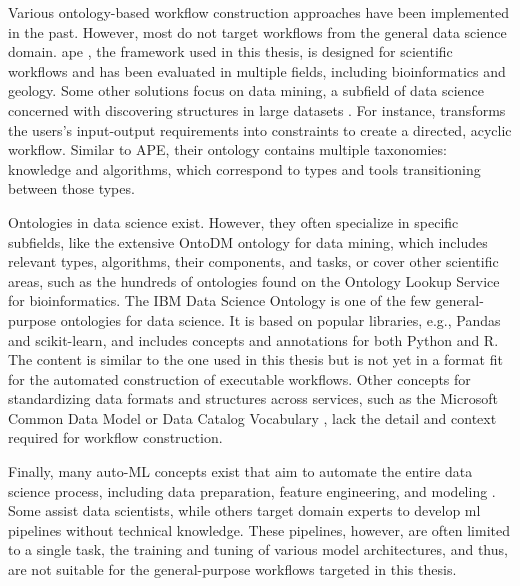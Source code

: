 Various ontology-based workflow construction approaches have been implemented in the past. However, most do not target workflows from the general data science domain. \ac{ape} \cite{kasalica2022synthesis}, the framework used in this thesis, is designed for scientific workflows and has been evaluated in multiple fields, including bioinformatics and geology. Some other solutions focus on data mining, a subfield of data science concerned with discovering structures in large datasets \cite{hand2007datamining}. For instance, \cite{OntoDMWorkflowComposition} transforms the users's input-output requirements into constraints to create a directed, acyclic workflow. Similar to APE, their ontology contains multiple taxonomies: knowledge and algorithms, which correspond to types and tools transitioning between those types.

Ontologies in data science exist. However, they often specialize in specific subfields, like the extensive OntoDM \cite{ontoDM} ontology for data mining, which includes relevant types, algorithms, their components, and tasks, or cover other scientific areas, such as the hundreds of ontologies found on the Ontology Lookup Service \cite{ols4} for bioinformatics. The IBM Data Science Ontology \cite{ibmdatascience} is one of the few general-purpose ontologies for data science. It is based on popular libraries, e.g., Pandas and scikit-learn, and includes concepts and annotations for both Python and R. The content is similar to the one used in this thesis but is not yet in a format fit for the automated construction of executable workflows. Other concepts for standardizing data formats and structures across services, such as the Microsoft Common Data Model \cite{microsoftcdm} or Data Catalog Vocabulary \cite{dcat}, lack the detail and context required for workflow construction.

Finally, many auto-ML concepts exist that aim to automate the entire data science process, including data preparation, feature engineering, and modeling \cite{he2021automl,hutter2019automated}. Some assist data scientists, while others target domain experts to develop \ac{ml} pipelines without technical knowledge. These pipelines, however, are often limited to a single task, the training and tuning of various model architectures, and thus, are not suitable for the general-purpose workflows targeted in this thesis.